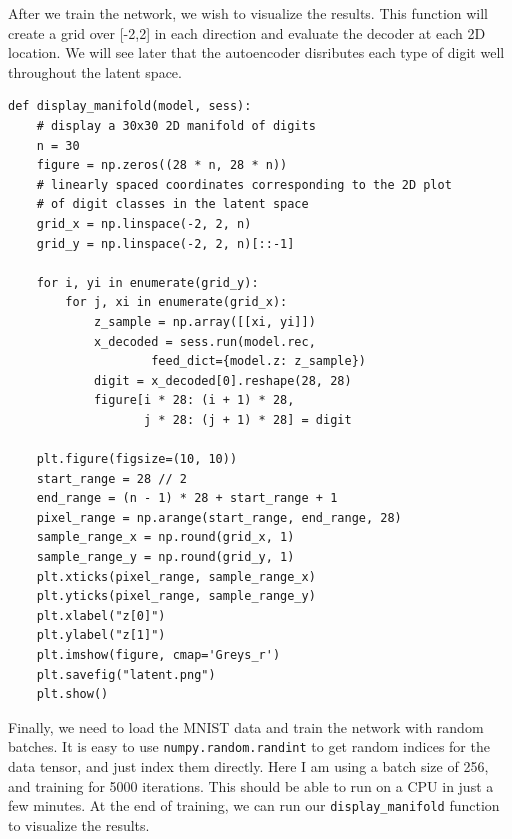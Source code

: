 \documentclass[10 pt]{article}
\begin{document}
After we train the network, we wish to visualize the results. 
This function will create a grid over [-2,2] in each direction and evaluate 
the decoder at each 2D location. 
We will see later that the autoencoder disributes each type of digit well throughout
the latent space.

\begin{lstlisting}
def display_manifold(model, sess):
    # display a 30x30 2D manifold of digits
    n = 30
    figure = np.zeros((28 * n, 28 * n))
    # linearly spaced coordinates corresponding to the 2D plot
    # of digit classes in the latent space
    grid_x = np.linspace(-2, 2, n)
    grid_y = np.linspace(-2, 2, n)[::-1]

    for i, yi in enumerate(grid_y):
        for j, xi in enumerate(grid_x):
            z_sample = np.array([[xi, yi]])
            x_decoded = sess.run(model.rec, 
                    feed_dict={model.z: z_sample})
            digit = x_decoded[0].reshape(28, 28)
            figure[i * 28: (i + 1) * 28,
                   j * 28: (j + 1) * 28] = digit

    plt.figure(figsize=(10, 10))
    start_range = 28 // 2
    end_range = (n - 1) * 28 + start_range + 1
    pixel_range = np.arange(start_range, end_range, 28)
    sample_range_x = np.round(grid_x, 1)
    sample_range_y = np.round(grid_y, 1)
    plt.xticks(pixel_range, sample_range_x)
    plt.yticks(pixel_range, sample_range_y)
    plt.xlabel("z[0]")
    plt.ylabel("z[1]")
    plt.imshow(figure, cmap='Greys_r')
    plt.savefig("latent.png")
    plt.show()

\end{lstlisting}

Finally, we need to load the MNIST data and train the network with random batches.
It is easy to use \texttt{numpy.random.randint} to get random indices for the data
tensor, and just index them directly.
Here I am using a batch size of 256, and training for 5000 iterations.
This should be able to run on a CPU in just a few minutes. 
At the end of training, we can run our \texttt{display\_manifold} function to visualize the results.
\end{document}
